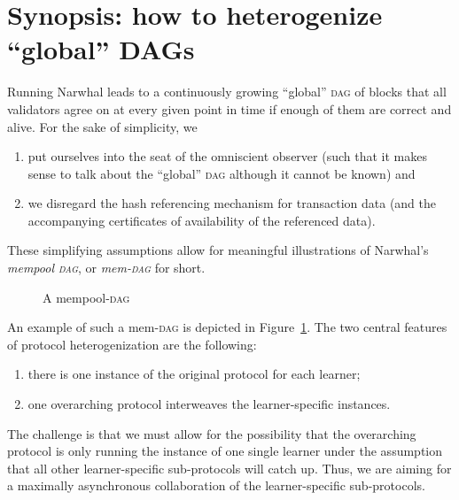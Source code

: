 \documentclass[%
dvipsnames]{article}
\theoremstyle{definition}
\newcommand{\Dag}[1][]{\textsc{dag}#1\xspace}
\begin{document}
\section{Synopsis: %
  how to heterogenize  “global” DAGs
}
\label{sec:overview}
Running  Narwhal \cite{NT} leads to a continuously growing “global” \Dag of blocks that %
all validators agree on at every given point in time %
if enough of them are correct and alive.
For the sake of simplicity,
we
\begin{enumerate}
\item
  put ourselves into the seat of the omniscient observer
  (such that it makes sense to talk about the “global” \Dag although it cannot be known) %
  and
\item
  we disregard the hash referencing mechanism for transaction data
  (and the accompanying certificates of availability of the referenced data).
\end{enumerate}
These simplifying assumptions allow for meaningful illustrations 
of Narwhal's \emph{mempool \Dag}, or \emph{mem-\Dag} for short. 
\begin{figure}[htb]
  \centering
  \caption{A mempool-\Dag }
  \label{fig:conceptual-dag}
\end{figure}
An example of such a mem-\Dag is 
depicted in Figure~\ref{fig:conceptual-dag}. %
The two central features of protocol heterogenization are the following:
\begin{enumerate}
\item there is one instance of the original protocol for each learner;
\item one overarching protocol interweaves the learner-specific instances.
\end{enumerate}
The challenge is that we must allow for the possibility that %
the overarching protocol is only running the instance of one single learner %
under the assumption that %
all other learner-specific sub-protocols will catch up. %
Thus, %
we are aiming for a maximally asynchronous collaboration of the learner-specific
sub-protocols. 




\end{document}
